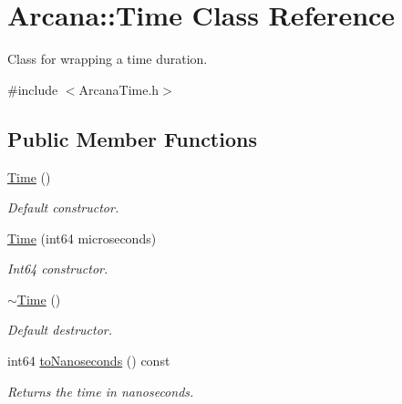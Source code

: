 \hypertarget{class_arcana_1_1_time}{}\section{Arcana\+:\+:Time Class Reference}
\label{class_arcana_1_1_time}


Class for wrapping a time duration.  




{\ttfamily \#include $<$Arcana\+Time.\+h$>$}

\subsection*{Public Member Functions}
\begin{DoxyCompactItemize}
\item 
\mbox{\hyperlink{class_arcana_1_1_time_a5a14897b858a9ab2ee905697981318c9}{Time}} ()
\begin{DoxyCompactList}\small\item\em Default constructor. \end{DoxyCompactList}\item 
\mbox{\hyperlink{class_arcana_1_1_time_a12d30cc17ba7aabd9910fa33c4bf3271}{Time}} (int64 microseconds)
\begin{DoxyCompactList}\small\item\em Int64 constructor. \end{DoxyCompactList}\item 
\mbox{\label{class_arcana_1_1_time_aa073ffdc5313b86ac0190bbf71872845}} 
\mbox{\hyperlink{class_arcana_1_1_time_aa073ffdc5313b86ac0190bbf71872845}{$\sim$\+Time}} ()
\begin{DoxyCompactList}\small\item\em Default destructor. \end{DoxyCompactList}\item 
\mbox{\label{class_arcana_1_1_time_a62cfa57729d88885fada52012d8d39e4}} 
int64 \mbox{\hyperlink{class_arcana_1_1_time_a62cfa57729d88885fada52012d8d39e4}{to\+Nanoseconds}} () const
\begin{DoxyCompactList}\small\item\em Returns the time in nanoseconds. \end{DoxyCompactList}\item 
\mbox{\label{class_arcana_1_1_time_ae5494b64cfb03356395c7177b1db6ec9}} 

\end{DoxyCompactItemize}
